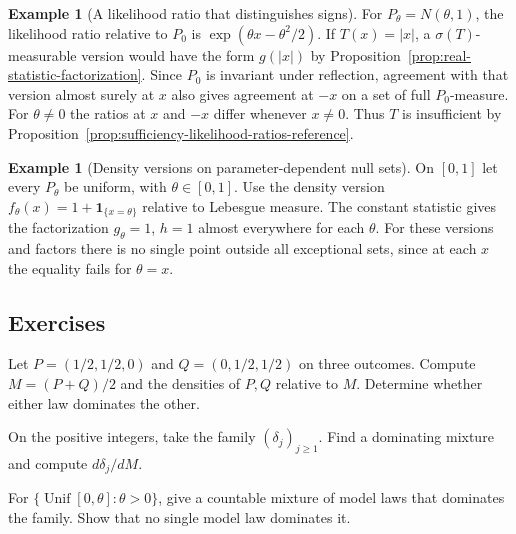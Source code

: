 \documentclass[11pt,oneside]{book}
\theoremstyle{definition}
\newtheorem{example}[theorem]{Example}
\theoremstyle{remark}
\begin{document}
\begin{example}[A likelihood ratio that distinguishes signs]
\label{ex:factorization-folded-normal-failure}
For $P_\theta=N(\theta,1)$, the likelihood ratio relative to
$P_0$ is $\exp(\theta x-\theta^2/2)$. If $T(x)=|x|$, a
$\sigma(T)$-measurable version would have the form $g(|x|)$
by Proposition~\ref{prop:real-statistic-factorization}.
Since $P_0$ is invariant under reflection, agreement with
that version almost surely at $x$ also gives agreement at
$-x$ on a set of full $P_0$-measure. For $\theta\ne0$ the
ratios at $x$ and $-x$ differ whenever $x\ne0$. Thus $T$ is
insufficient by Proposition~\ref{prop:sufficiency-likelihood-ratios-reference}.
\end{example}

\begin{example}[Density versions on parameter-dependent null sets]
\label{ex:factorization-parameterwise-null-sets}
On $[0,1]$ let every $P_\theta$ be uniform, with $\theta\in[0,1]$.
Use the density version $f_\theta(x)=1+\mathbf 1_{\{x=\theta\}}$
relative to Lebesgue measure. The constant statistic gives
the factorization $g_\theta=1$, $h=1$ almost everywhere for
each $\theta$. For these versions and factors there is no
single point outside all exceptional sets, since at each
$x$ the equality fails for $\theta=x$.
\end{example}

\subsection{Exercises}
\label{subsec:practice-4-3}

\begin{practiceexercise}
\label{pex:factorization-two-law-mixture}
Let $P=(1/2,1/2,0)$ and $Q=(0,1/2,1/2)$ on three outcomes.
Compute $M=(P+Q)/2$ and the densities of $P,Q$ relative to $M$.
Determine whether either law dominates the other.
\end{practiceexercise}

\begin{practiceexercise}
\label{pex:factorization-countable-point-mixture}
On the positive integers, take the family $(\delta_j)_{j\geq1}$.
Find a dominating mixture and compute $d\delta_j/dM$.
\end{practiceexercise}

\begin{practiceexercise}
\label{pex:factorization-uniform-mixture}
For $\{\operatorname{Unif}[0,\theta]:\theta>0\}$, give a
countable mixture of model laws that dominates the family.
Show that no single model law dominates it.
\end{practiceexercise}
\end{document}

